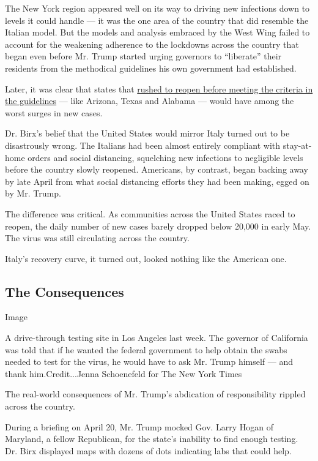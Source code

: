 The New York region appeared well on its way to driving new infections
down to levels it could handle --- it was the one area of the country
that did resemble the Italian model. But the models and analysis
embraced by the West Wing failed to account for the weakening adherence
to the lockdowns across the country that began even before Mr. Trump
started urging governors to ``liberate'' their residents from the
methodical guidelines his own government had established.

Later, it was clear that states that
\href{https://www.nytimes.com/interactive/2020/05/07/us/coronavirus-states-reopen-criteria.html}{rushed
to reopen before meeting the criteria in the guidelines} --- like
Arizona, Texas and Alabama --- would have among the worst surges in new
cases.

Dr. Birx's belief that the United States would mirror Italy turned out
to be disastrously wrong. The Italians had been almost entirely
compliant with stay-at-home orders and social distancing, squelching new
infections to negligible levels before the country slowly reopened.
Americans, by contrast, began backing away by late April from what
social distancing efforts they had been making, egged on by Mr. Trump.

The difference was critical. As communities across the United States
raced to reopen, the daily number of new cases barely dropped below
20,000 in early May. The virus was still circulating across the country.

Italy's recovery curve, it turned out, looked nothing like the American
one.

\hypertarget{the-consequences}{%
\subsection{The Consequences}\label{the-consequences}}

Image

A drive-through testing site in Los Angeles last week. The governor of
California was told that if he wanted the federal government to help
obtain the swabs needed to test for the virus, he would have to ask Mr.
Trump himself --- and thank him.Credit...Jenna Schoenefeld for The New
York Times

The real-world consequences of Mr. Trump's abdication of responsibility
rippled across the country.

During a briefing on April 20, Mr. Trump mocked Gov. Larry Hogan of
Maryland, a fellow Republican, for the state's inability to find enough
testing. Dr. Birx displayed maps with dozens of dots indicating labs
that could help.

